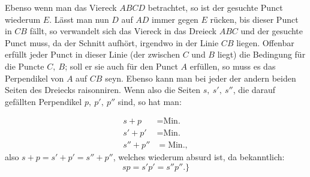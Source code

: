 \indent Ebenso wenn man das Viereck \(ABCD\) betrachtet, so ist der gesuchte Punct wiederum \(E\). Lässt man nun \(D\) auf \(AD\) immer gegen \(E\) rücken, bis dieser Punct in \(CB\) fällt, so verwandelt sich das Viereck in das Dreieck \(ABC\) und der gesuchte Punct muss, da der Schnitt aufhört, irgendwo in der Linie \(CB\) liegen. Offenbar erfüllt jeder Punct in dieser Linie (der zwischen \(C\) und \(B\) liegt\footnotemark{}) die Bedingung für die Puncte \(C,\ B\); soll er sie auch für den Punct \(A\) erfüllen, so muss es das Perpendikel von \(A\) auf \(CB\) seyn. Ebenso kann man bei jeder der andern beiden Seiten des Dreiecks raisonniren. Wenn also die Seiten \(s,\ s',\ s''\), die darauf gefällten Perpendikel \(p,\ p',\ p''\) sind, so hat man:
\begin{center}
\end{center}
\[
\begin{aligned}
s+p&=\text{Min.}\\
s'+p'&=\text{Min.}\\
s''+p''&=\text{Min.},
\end{aligned}
\]
\noindent also \(s+p=s'+p'=s''+p''\), welches wiederum absurd ist, da bekanntlich:
\[sp=s'p'=s''p''.\text{\}}\]
